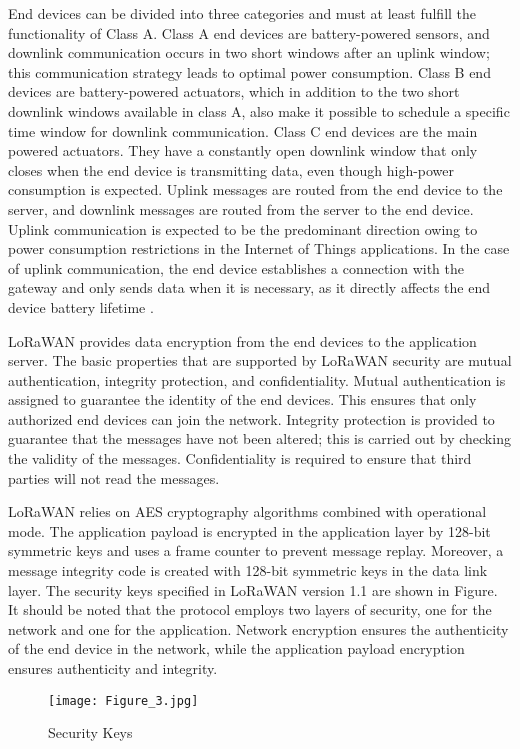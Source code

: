\documentclass[manuscript,screen,review=false]{acmart}
\begin{document}
End devices can be divided into three categories and must at least fulfill the functionality of Class A. 
Class A end devices are battery-powered sensors, and downlink communication occurs in two short windows after an uplink window; this communication strategy leads to optimal power consumption. Class B end devices are battery-powered actuators, which in addition to the two short downlink windows available in class A, also make it possible to schedule a specific time window for downlink communication. Class C end devices are the main powered actuators. They have a constantly open downlink window that only closes when the end device is transmitting data, even though high-power consumption is expected. Uplink messages are routed from the end device to the server, and downlink messages are routed from the server to the end device. Uplink communication is expected to be the predominant direction owing to power consumption restrictions in the Internet of Things applications. In the case of uplink communication, the end device establishes a connection with the gateway and only sends data when it is necessary, as it directly affects the end device battery lifetime \cite{lorawan1.1}.

LoRaWAN provides data encryption from the end devices to the application server. The basic properties that are supported by LoRaWAN security are mutual authentication, integrity protection, and confidentiality. Mutual authentication is assigned to guarantee the identity of the end devices. This ensures that only authorized end devices can join the network. Integrity protection is provided to guarantee that the messages have not been altered; this is carried out by checking the validity of the messages. Confidentiality is required to ensure that third parties will not read the messages.

LoRaWAN relies on AES cryptography algorithms combined with operational mode. The application payload is encrypted in the application layer by 128-bit symmetric keys and uses a frame counter to prevent message replay. Moreover, a message integrity code is created with 128-bit symmetric keys in the data link layer. The security keys specified in LoRaWAN version 1.1 are shown in Figure. It should be noted that the protocol employs two layers of security, one for the network and one for the application. Network encryption ensures the authenticity of the end device in the network, while the application payload encryption ensures authenticity and integrity.

\begin{figure}[h]
  \centering
  \texttt{[image: Figure\_3.jpg]}
  \caption{Security Keys}
\end{figure}
\end{document}
